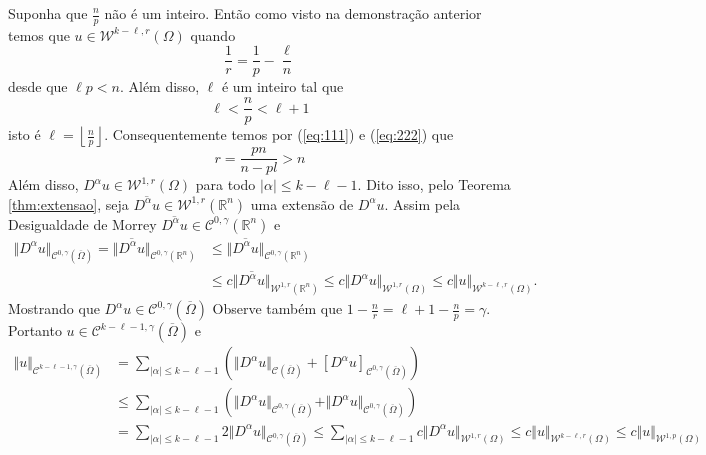 \documentclass[a4paper, 11pt]{book}
\theoremstyle{definition}
\newcommand{\bR}{\mathbb{R}}
\newcommand{\cC}{\mathcal{C}}
\newcommand{\cW}{\mathcal{W}}
\begin{document}
\begin{prf}
    Suponha que $\frac{n}{p}$ não é um inteiro. Então como visto na demonstração anterior temos que $u \in \cW^{k-\ell,r}(\Omega)$ quando
    \begin{equation} \label{eq:111}
        \frac{1}{r} = \frac{1}{p} - \frac{\ell}{n}
    \end{equation}
    desde que $\ell p < n$. Além disso, $\ell$ é um inteiro tal que
    \begin{equation} \label{eq:222}
        \ell < \frac{n}{p} < \ell + 1
    \end{equation}
    isto é $\ell = \left\lfloor \frac{n}{p} \right\rfloor$.
    Consequentemente temos por (\ref{eq:111}) e (\ref{eq:222}) que
    \[
        r = \frac{pn}{n-pl} > n
    \]
    Além disso, $D^\alpha u \in \cW^{1,r}(\Omega)$ para todo $|\alpha| \leqslant k - \ell -1$. Dito isso, pelo Teorema \ref{thm:extensao}, seja $\overline{D^\alpha u} \in \cW^{1,r}(\bR^n)$ uma extensão de $D^\alpha u$.
    Assim pela Desigualdade de Morrey $\overline{D^\alpha u} \in \cC^{0,\gamma}(\bR^n)$ e
    \[
        \begin{aligned}
            \Vert D^\alpha u \Vert_{\cC^{0,\gamma}(\overline\Omega)} = \Vert \overline{D^\alpha u} \Vert_{\cC^{0,\gamma}(\bR^n)} &\leqslant \Vert \overline{D^\alpha u} \Vert_{\cC^{0,\gamma}(\bR^n)} \\
            &\leqslant c \Vert \overline{D^\alpha u} \Vert_{\cW^{1,r}(\bR^n)}\leqslant c \Vert D^\alpha u \Vert_{\cW^{1,r}(\Omega)} \leqslant c \Vert u \Vert_{\cW^{k-\ell,r}(\Omega)}.
        \end{aligned}
    \]
    Mostrando que $D^\alpha u \in \cC^{0,\gamma}(\overline\Omega)$
    Observe também que $1 - \frac{n}{r} = \ell +1 - \frac{n}{p} = \gamma$.
    Portanto $u \in \cC^{k-\ell-1,\gamma}(\overline\Omega)$ e
    \[
        \begin{aligned}
            \Vert u \Vert_{\cC^{k-\ell-1,\gamma}(\overline\Omega)} &= \sum_{|\alpha| \leqslant k - \ell - 1} \left( \Vert D^\alpha u \Vert_{\cC(\overline\Omega)} + [D^\alpha u]_{\cC^{0,\gamma}(\overline\Omega)} \right)\\ &\leqslant \sum_{|\alpha| \leqslant k - \ell - 1} \left(    \Vert D^\alpha u \Vert_{\cC^{0,\gamma}(\overline\Omega)} +  \Vert D^\alpha u \Vert_{\cC^{0,\gamma}(\overline\Omega)}\right)\\
            &=\sum_{|\alpha| \leqslant k - \ell - 1}\!\!\!\! 2\Vert D^\alpha u \Vert_{\cC^{0,\gamma}(\overline\Omega)} \leqslant \sum_{|\alpha| \leqslant k - \ell - 1} \!\!\! c\Vert D^\alpha u \Vert_{\cW^{1,r}(\Omega)} \leqslant c \Vert u \Vert_{\cW^{k-\ell,r}(\Omega)} \leqslant c \Vert u \Vert_{\cW^{1,p}(\Omega)}
        \end{aligned}
    \]


\end{prf}
\end{document}
